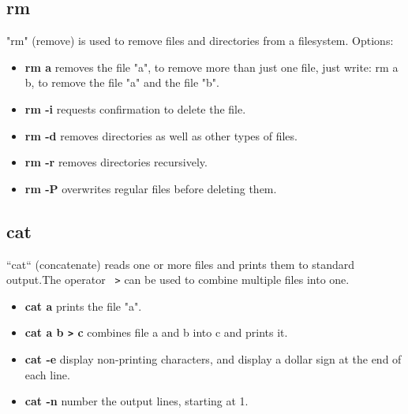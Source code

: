\documentclass[10pt,a4paper]{scrartcl}
\begin{document}
\subsection{rm}
"rm" (remove) is used to remove files and directories from a filesystem. Options:
\begin{doublespacing}
\begin{itemize}
\item{\bf{rm a}} \qquad removes the file "a", to remove more than just one file, just write: rm a b, to remove the file "a" and the file "b".
\item{\bf{rm -i}} \qquad requests confirmation to delete the file.
\item{\bf{rm -d}} \qquad  removes directories as well as other types of
                 files.
\item{\bf{rm -r}} \qquad removes directories recursively.
\item{\bf{rm -P}} \qquad overwrites regular files before deleting them. 
\end{itemize}
\end{doublespacing}

\subsection{cat}
“cat“ (concatenate) reads one or more files and prints them to standard output.The operator \verb$ >$ can be used to combine multiple files into one.
\begin{doublespacing}
\begin{itemize}
\item{\bf{cat a}} \qquad prints the file "a".
\item{\bf{cat a b \verb$>$ c}} \qquad combines file a and b into c and prints it.
\item{\bf{cat -e}} \qquad display non-printing characters, and display
             a dollar sign at the end of each line.
\item{\bf{cat -n}} \qquad number the output lines, starting at 1.
\end{itemize}
\end{doublespacing}






\end{document}

